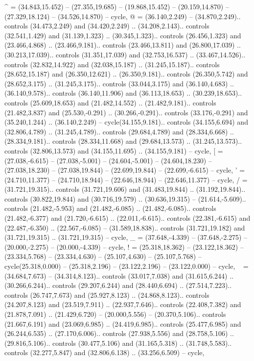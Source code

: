 {^} = {(34.843,15.452) -- (27.355,19.685) -- (19.868,15.452) -- (20.159,14.870) -- (27.329,18.124) -- (34.526,14.870) -- cycle},
{@} = {(36.140,2.249) -- (34.870,2.249).. controls (34.473,2.249) and (34.420,2.249) .. (34.208,2.143).. controls (32.541,1.429) and (31.139,1.323) .. (30.345,1.323).. controls (26.456,1.323) and (23.466,4.868) .. (23.466,9.181).. controls (23.466,13.811) and (26.800,17.039) .. (30.213,17.039).. controls (31.351,17.039) and (32.753,16.537) .. (33.467,14.526).. controls (32.832,14.922) and (32.038,15.187) .. (31.245,15.187).. controls (28.652,15.187) and (26.350,12.621) .. (26.350,9.181).. controls (26.350,5.742) and (28.652,3.175) .. (31.245,3.175).. controls (33.044,3.175) and (36.140,4.683) .. (36.140,9.578).. controls (36.140,11.906) and (36.113,18.653) .. (30.239,18.653).. controls (25.609,18.653) and (21.482,14.552) .. (21.482,9.181).. controls (21.482,3.837) and (25.530,-0.291) .. (30.266,-0.291).. controls (33.176,-0.291) and (35.240,1.244) .. (36.140,2.249) -- cycle(34.155,9.181).. controls (34.155,6.694) and (32.806,4.789) .. (31.245,4.789).. controls (29.684,4.789) and (28.334,6.668) .. (28.334,9.181).. controls (28.334,11.668) and (29.684,13.573) .. (31.245,13.573).. controls (32.806,13.573) and (34.155,11.695) .. (34.155,9.181) -- cycle},
{[} = {(27.038,-6.615) -- (27.038,-5.001) -- (24.604,-5.001) -- (24.604,18.230) -- (27.038,18.230) -- (27.038,19.844) -- (22.699,19.844) -- (22.699,-6.615) -- cycle},
{'} = {(24.710,11.377) -- (24.710,18.944) -- (22.646,18.944) -- (22.646,11.377) -- cycle},
{/} = {(31.721,19.315).. controls (31.721,19.606) and (31.483,19.844) .. (31.192,19.844).. controls (30.822,19.844) and (30.716,19.579) .. (30.636,19.315) -- (21.614,-5.609).. controls (21.482,-5.953) and (21.482,-6.085) .. (21.482,-6.085).. controls (21.482,-6.377) and (21.720,-6.615) .. (22.011,-6.615).. controls (22.381,-6.615) and (22.487,-6.350) .. (22.567,-6.085) -- (31.589,18.838).. controls (31.721,19.182) and (31.721,19.315) .. (31.721,19.315) -- cycle},
{_} = {(37.648,-4.339) -- (37.648,-2.275) -- (20.000,-2.275) -- (20.000,-4.339) -- cycle},
{!} = {(25.318,18.362) -- (23.122,18.362) -- (23.334,5.768) -- (23.334,4.630) -- (25.107,4.630) -- (25.107,5.768) -- cycle(25.318,0.000) -- (25.318,2.196) -- (23.122,2.196) -- (23.122,0.000) -- cycle},
{~} = {(34.684,7.673) -- (34.314,8.123).. controls (33.017,7.038) and (31.615,6.244) .. (30.266,6.244).. controls (29.207,6.244) and (28.440,6.694) .. (27.514,7.223).. controls (26.747,7.673) and (25.927,8.123) .. (24.868,8.123).. controls (24.207,8.123) and (23.519,7.911) .. (22.937,7.646).. controls (22.408,7.382) and (21.878,7.091) .. (21.429,6.720) -- (20.000,5.556) -- (20.370,5.106).. controls (21.667,6.191) and (23.069,6.985) .. (24.419,6.985).. controls (25.477,6.985) and (26.244,6.535) .. (27.170,6.006).. controls (27.938,5.556) and (28.758,5.106) .. (29.816,5.106).. controls (30.477,5.106) and (31.165,5.318) .. (31.748,5.583).. controls (32.277,5.847) and (32.806,6.138) .. (33.256,6.509) -- cycle},
